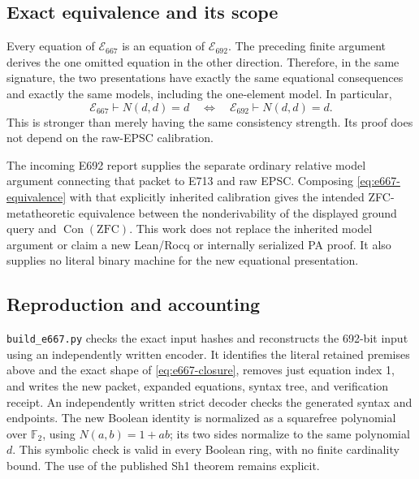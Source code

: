 \subsection{Exact equivalence and its scope}

Every equation of \(\mathcal E_{667}\) is an equation of
\(\mathcal E_{692}\).  The preceding finite argument derives the one
omitted equation in the other direction.  Therefore, in the same
signature, the two presentations have exactly the same equational
consequences and exactly the same models, including the one-element model.
In particular,
\begin{equation}
 \mathcal E_{667}\vdash N(d,d)=d
 \quad\Longleftrightarrow\quad
 \mathcal E_{692}\vdash N(d,d)=d.
\label{eq:e667-equivalence}
\end{equation}
This is stronger than merely having the same consistency strength.
Its proof does not depend on the raw-EPSC calibration.

The incoming E692 report supplies the separate ordinary relative model
argument connecting that packet to E713 and raw EPSC.  Composing
\eqref{eq:e667-equivalence} with that explicitly inherited calibration gives
the intended ZFC-metatheoretic equivalence between the nonderivability of
the displayed ground query and \(\operatorname{Con}(\mathrm{ZFC})\).
This work does not replace the inherited model argument or claim a new
Lean/Rocq or internally serialized PA proof.  It also supplies no literal
binary machine for the new equational presentation.

\subsection{Reproduction and accounting}

\texttt{build\_e667.py} checks the exact input hashes and reconstructs the
692-bit input using an independently written encoder.  It identifies the
literal retained premises above and the exact shape of
\eqref{eq:e667-closure}, removes just equation index 1, and writes the new
packet, expanded equations, syntax tree, and verification receipt.
An independently written strict decoder checks the generated syntax and
endpoints.  The new Boolean identity is normalized as a squarefree
polynomial over \(\mathbb F_2\), using \(N(a,b)=1+ab\); its two sides
normalize to the same polynomial \(d\).  This symbolic check is valid in
every Boolean ring, with no finite cardinality bound.  The use of the
published Sh1 theorem remains explicit.

